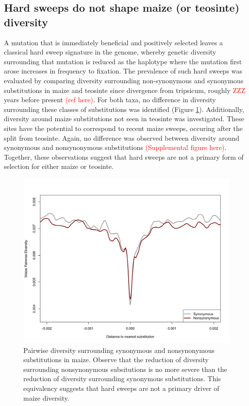 \documentclass{pnastwo}
\begin{document}
\begin{article}
\subsection{Hard sweeps do not shape maize (or teosinte) diversity}
A mutation that is immediately beneficial and positively selected leaves a classical hard
sweep signature in the genome, whereby genetic diversity surrounding
that mutation is reduced as the haplotype where the mutation first
arose increases in frequency to fixation. The prevalence of such hard
sweeps was evaluated by comparing diversity
surrounding non-synonymous and synonymous substitutions in maize and
teosinte since divergence from tripsicum, roughly \textcolor{red}{ZZZ} years before
present \textcolor{red}{(ref here)}. For both taxa, no difference in diversity
surrounding these classes of substitutions was identified (Figure \ref{hardSweeps}). Additionally, diversity around maize substitutions
not seen in teosinte was investigated. These sites have the
potential to correspond to recent maize sweeps, occuring after the
split from teosinte. Again, no difference was observed
between diversity around synonymous and nonsynonymous
substitutions \textcolor{red}{(Supplemental figure here)}. Together, these observations suggest that hard sweeps
are not a primary form of selection for either maize or teosinte.

\begin{figure}[b]
\centering
\includegraphics[width=.5\textwidth]{FigsAndFiles/plotDiversity_TvM_Folded2_unNeutralized}
\caption{Pairwise diversity surrounding synonymous and nonsynonymous
  substitutions in maize. Observe that the reduction of diversity
  surrounding nonsynonymous subsitutions is no more severe than the
  reduction of diversity surrounding synonymous substitutions. This
  equivalency suggests that hard sweeps are not a primary driver of
  maize diversity.}
\label{hardSweeps}
\end{figure}



\end{article}
\end{document}
